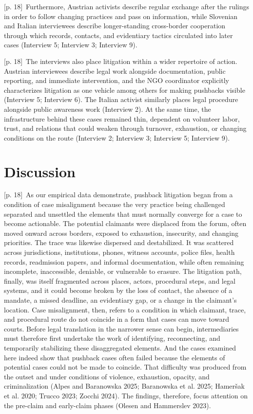 \documentclass[10pt,a4paper]{article}
\begin{document}
{\scriptsize\color{gray} [p. 18]}\ Furthermore, Austrian activists describe regular exchange after the rulings in order to follow changing practices and pass on information, while Slovenian and Italian interviewees describe longer-standing cross-border cooperation through which records, contacts, and evidentiary tactics circulated into later cases (Interview 5; Interview 3; Interview 9).\par
{\scriptsize\color{gray} [p. 18]}\ The interviews also place litigation within a wider repertoire of action. Austrian interviewees describe legal work alongside documentation, public reporting, and immediate intervention, and the NGO coordinator explicitly characterizes litigation as one vehicle among others for making pushbacks visible (Interview 5; Interview 6). The Italian activist similarly places legal procedure alongside public awareness work (Interview 2). At the same time, the infrastructure behind these cases remained thin, dependent on volunteer labor, trust, and relations that could weaken through turnover, exhaustion, or changing conditions on the route (Interview 2; Interview 3; Interview 5; Interview 9).\par
{}\section*{Discussion}
{\scriptsize\color{gray} [p. 18]}\ As our empirical data demonstrate, pushback litigation began from a condition of case misalignment because the very practice being challenged separated and unsettled the elements that must normally converge for a case to become actionable. The potential claimants were displaced from the forum, often moved onward across borders, exposed to exhaustion, insecurity, and changing priorities. The trace was likewise dispersed and destabilized. It was scattered across jurisdictions, institutions, phones, witness accounts, police files, health records, readmission papers, and informal documentation, while often remaining incomplete, inaccessible, deniable, or vulnerable to erasure. The litigation path, finally, was itself fragmented across places, actors, procedural steps, and legal systems, and it could become broken by the loss of contact, the absence of a mandate, a missed deadline, an evidentiary gap, or a change in the claimant’s location. Case misalignment, then, refers to a condition in which claimant, trace, and procedural route do not coincide in a form that cases can move toward courts. Before legal translation in the narrower sense can begin, intermediaries must therefore first undertake the work of identifying, reconnecting, and temporarily stabilizing these disaggregated elements. And the cases examined here indeed show that pushback cases often failed because the elements of potential cases could not be made to coincide. That difficulty was produced from the outset and under conditions of violence, exhaustion, opacity, and criminalization (Alpes and Baranowska 2025; Baranowska et al. 2025; Hameršak et al. 2020; Trucco 2023; Zocchi 2024). The findings, therefore, focus attention on the pre-claim and early-claim phases (Olesen and Hammerslev 2023).\par
\end{document}
